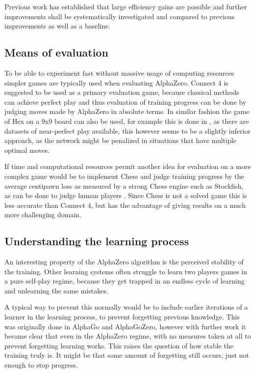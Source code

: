 \documentclass[12pt,onecolumn,oneside,titlepage]{article}
\begin{document}
Previous work has established that large efficiency gains are possible and further improvements shall be systematically investigated and compared to previous improvements as well as a baseline.

\subsection{Means of evaluation}

To be able to experiment fast without massive usage of computing resources simpler games are typically used when evaluating AlphaZero.
Connect 4 is suggested to be used as a primary evaluation game, because classical methods can achieve perfect play and thus evaluation of training progress can be done by judging moves made by AlphaZero in absolute terms.
In similar fashion the game of Hex on a 9x9 board can also be used, for example this is done in \cite{anonymous2020threehead}, as there are datasets of near-perfect play available, this however seems to be a slightly inferior approach, as the network might be penalized
in situations that have multiple optimal moves.

If time and computational resources permit another idea for evaluation on a more complex game would be to implement Chess and judge training progress by the average centipawn loss as measured by a strong Chess engine such as Stockfish, as can be done to judge human players \cite{guid2011using}.
Since Chess is not a solved game this is less accurate than Connect 4, but has the advantage of giving results on a much more challenging domain.


\subsection{Understanding the learning process}

An interesting property of the AlphaZero algorithm is the perceived stability of the training. Other learning systems often struggle to learn two players games in a pure self-play regime, because they get trapped in an endless cycle of learning and unlearning the same mistakes.

A typical way to prevent this normally would be to include earlier iterations of a learner in the learning process, to prevent forgetting previous knowledge.
This was originally done in AlphaGo and AlphaGoZero, however with further work it became clear that even in the AlphaZero regime, with no measures taken at all to prevent forgetting learning works. 
This raises the question of how stable the training truly is. It might be that some amount of forgetting still occurs, just not enough to stop progress.
\end{document}
